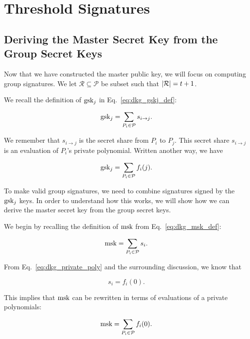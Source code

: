\section{Threshold Signatures}
\label{sec:ss_threshold}

\subsection{Deriving the Master Secret Key from the Group Secret Keys}

Now that we have constructed the master public key,
we will focus on computing group signatures.
We let $\mathcal{R}\subseteq\mathcal{P}$ be subset such that
$\left| \mathcal{R} \right| = t+1$.

We recall the definition of $\textrm{gsk}{}_{j}$ in Eq.~\eqref{eq:dkg_gskj_def}:

\begin{equation}
    \textrm{gsk}{}_{j} = \sum_{P_{i}\in\mathcal{P}} s_{i\to j}.
\end{equation}

\noindent
We remember that $s_{i\to j}$ is the secret share
from $P_{i}$ to $P_{j}$.
This secret share $s_{i\to j}$ is an evaluation of $P_{i}$'s private polynomial.
Written another way, we have

\begin{equation}
    \textrm{gsk}{}_{j} = \sum_{P_{i}\in\mathcal{P}} f_{i}(j).
\end{equation}

To make valid group signatures, we need to combine signatures
signed by the $\textrm{gsk}{}_{j}$ keys.
In order to understand how this works, we will show how we can
derive the master secret key from the group secret keys.

We begin by recalling the definition of $\textrm{msk}{}$
from Eq.~\eqref{eq:dkg_msk_def}:

\begin{equation}
    \textrm{msk}{} = \sum_{P_{i}\in\mathcal{P}} s_{i}.
\end{equation}

\noindent
From Eq.~\eqref{eq:dkg_private_poly} and the surrounding discussion,
we know that

\begin{equation}
    s_{i} = f_{i}(0).
\end{equation}

\noindent
This implies that $\textrm{msk}{}$ can be rewritten in terms of
evaluations of a private polynomials:

\begin{equation}
    \textrm{msk}{} = \sum_{P_{i}\in\mathcal{P}} f_{i}(0).
\end{equation}

